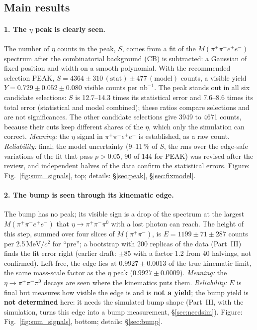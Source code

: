 \documentclass[11pt,a4paper]{article}
\newcommand{\piz}{\ensuremath{\pi^{0}}\xspace}
\newcommand{\pipi}{\ensuremath{\pi^{+}\pi^{-}}\xspace}
\newcommand{\ppee}{\ensuremath{\pi^{+}\pi^{-}e^{+}e^{-}}\xspace}
\newcommand{\Mfour}{\ensuremath{M(\pi^{+}\pi^{-}e^{+}e^{-})}\xspace}
\newcommand{\Mpipi}{\ensuremath{M(\pi^{+}\pi^{-})}\xspace}
\newcommand{\nbinv}{\ensuremath{\mathrm{nb}^{-1}}\xspace}
\newcommand{\MeVcc}{\ensuremath{\mathrm{MeV}/c^{2}}\xspace}
\begin{document}
\subsection{Main results}
\label{sec:mainres}

\paragraph{1. The $\eta$ peak is clearly seen.} The number of $\eta$ counts in the peak, $S$, comes from a fit of the \Mfour spectrum
after the combinatorial background (CB) is subtracted: a Gaussian of fixed position and width on a smooth polynomial. With the
recommended selection PEAK, $S=4364\pm310\,(\mathrm{stat})\pm477\,(\mathrm{model})$ counts, a visible yield $Y=0.729\pm0.052\pm0.080$
visible counts per \nbinv. The peak stands out in all six candidate selections: $S$ is 12.7--14.3 times its statistical error and
7.6--8.6 times its total error (statistical and model combined); these ratios compare selections and are not significances. The
other candidate selections give 3949 to 4671 counts, because their cuts keep different shares of the $\eta$, which only the simulation can correct.
\emph{Meaning:} the $\eta$ signal in \ppee is established, as a raw count. \emph{Reliability:} final; the model uncertainty (9--11\,\%
of $S$, the rms over the edge-safe variations of the fit that pass $p>0.05$, 90 of 144 for PEAK) was revised after the review, and
independent halves of the data confirm the statistical errors. Figure: Fig.~\ref{fig:sum_signals}, top; details: \S\ref{sec:peak}, \S\ref{sec:fixmodel}.

\paragraph{2. The bump is seen through its kinematic edge.} The bump has no peak; its visible sign is a drop of the spectrum at the
largest \Mfour that $\eta\to\pipi\piz$ with a lost photon can reach. The height of this step, summed over four slices of \Mpipi, is
$E=1199\pm71\pm287$ counts per 2.5\,\MeVcc for ``pre''; a bootstrap with 200 replicas of the data (Part~III) finds the fit error right
(earlier draft: $\pm85$ with a factor 1.2 from 40 halvings, not confirmed). Left free, the
edge lies at $0.9927\pm0.0013$ of the true kinematic limit, the same mass-scale factor as the $\eta$ peak ($0.9927\pm0.0009$).
\emph{Meaning:} the $\eta\to\pipi\piz$ decays are seen where the kinematics puts them. \emph{Reliability:} $E$ is final but measures
how visible the edge is and is \textbf{not a yield}; the bump yield is \textbf{not determined} here: it needs the simulated bump shape
(Part~III, with the simulation, turns this edge into a bump measurement, \S\ref{sec:needsim}).
Figure: Fig.~\ref{fig:sum_signals}, bottom; details: \S\ref{sec:bump}.
\end{document}
